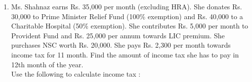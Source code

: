 \documentclass[journal,12pt,twocolumn]{IEEEtran}
\begin{document}
\begin{enumerate}
\item Ms. Shahnaz earns Rs. 35,000 per month (excluding HRA). She donates Rs. 30,000 to Prime Minister Relief Fund (100\% exemption) and Rs. 40,000 to a Charitable Hospital (50\% exemption). She contributes Rs. 5,000 per month to Provident Fund and Rs. 25,000 per annum towards LIC premium. She purchases NSC worth Rs. 20,000. She pays Rs. 2,300 per month towards income tax for 11 month. Find the amount of income tax she has to pay in 12th month of the year.\\
Use the following to calculate income tax :\\
\begin{table}[htb]
\Huge
{}
\end{table}
\end{enumerate}
\end{document}
